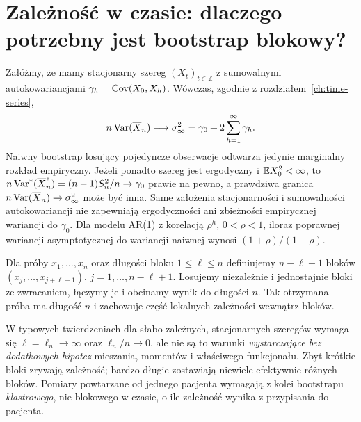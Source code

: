 \section{Zależność w czasie: dlaczego potrzebny jest bootstrap blokowy?}
\label{sec:block-bootstrap}
Załóżmy, że mamy stacjonarny szereg $(X_t)_{t\in\mathbb Z}$
z sumowalnymi autokowariancjami $\gamma_h=\operatorname{Cov}(X_0,X_h)$.
Wówczas, zgodnie z rozdziałem~\ref{ch:time-series},
\[
 n\operatorname{Var}(\overline X_n)\longrightarrow
 \sigma_\infty^2=\gamma_0+2\sum_{h=1}^\infty\gamma_h.
\]
Naiwny bootstrap losujący pojedyncze obserwacje odtwarza
jedynie marginalny rozkład empiryczny. Jeżeli ponadto
szereg jest ergodyczny i $\mathbb E X_0^2<\infty$, to
$n\operatorname{Var}^*(\overline X_n^*)=(n-1)S_n^2/n\to\gamma_0$
prawie na pewno, a prawdziwa granica
$n\operatorname{Var}(\overline X_n)\to\sigma_\infty^2$
może być inna. Same założenia stacjonarności i sumowalności
autokowariancji nie zapewniają ergodyczności ani
zbieżności empirycznej wariancji do $\gamma_0$.
Dla modelu AR(1) z korelacją $\rho^h$, $0<\rho<1$,
iloraz poprawnej wariancji asymptotycznej do wariancji
naiwnej wynosi $(1+\rho)/(1-\rho)$.

\begin{definicja}
Dla próby $x_1,\ldots,x_n$ oraz długości bloku
$1\le\ell\le n$ definiujemy $n-\ell+1$ bloków
$(x_j,\ldots,x_{j+\ell-1})$, $j=1,\ldots,n-\ell+1$.
Losujemy niezależnie i jednostajnie bloki ze zwracaniem,
łączymy je i obcinamy wynik do długości $n$.
Tak otrzymana próba ma długość $n$ i zachowuje
część lokalnych zależności wewnątrz bloków.
\end{definicja}

\begin{uwaga}
W typowych twierdzeniach dla słabo zależnych,
stacjonarnych szeregów wymaga się
$\ell=\ell_n\to\infty$ oraz $\ell_n/n\to0$,
ale nie są to warunki \emph{wystarczające bez dodatkowych
hipotez} mieszania, momentów i właściwego funkcjonału.
Zbyt krótkie bloki zrywają zależność; bardzo długie
zostawiają niewiele efektywnie różnych bloków.
Pomiary powtarzane od jednego pacjenta wymagają z kolei
bootstrapu \emph{klastrowego}, nie blokowego w czasie,
o ile zależność wynika z przypisania do pacjenta.
\end{uwaga}


